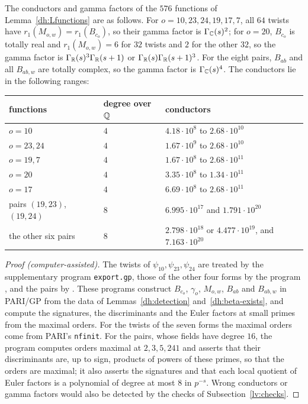 \begin{lemma}\label{dh:gamma}
The conductors and gamma factors of the $576$ functions of
Lemma~\ref{dh:Lfunctions} are as follows. For $o=10,23,24,19,17,7$, all $64$
twists have $r_1(M_{o,w})=r_1(B_{c_o})$, so their gamma factor is
$\Gamma_\mathbb C(s)^2$; for $o=20$, $B_{c_o}$ is totally real and
$r_1(M_{o,w})=6$ for $32$ twists and $2$ for the other $32$, so the gamma
factor is $\Gamma_\mathbb R(s)^3\Gamma_\mathbb R(s+1)$ or $\Gamma_\mathbb R(s)\Gamma_\mathbb R(s+1)^3$. For
the eight pairs, $B_{ab}$ and all $B_{ab,w}$ are totally complex, so the
gamma factor is $\Gamma_\mathbb C(s)^4$. The conductors lie in the following
ranges:
\begin{center}\small
\begin{tabular}{lll}
\toprule
functions & degree over $\mathbb Q$ & conductors\\
\midrule
$o=10$ & $4$ & $4.18\cdot10^8$ to $2.68\cdot10^{10}$\\
$o=23,24$ & $4$ & $1.67\cdot10^9$ to $2.68\cdot10^{10}$\\
$o=19,7$ & $4$ & $1.67\cdot10^8$ to $2.68\cdot10^{11}$\\
$o=20$ & $4$ & $3.35\cdot10^8$ to $1.34\cdot10^{11}$\\
$o=17$ & $4$ & $6.69\cdot10^8$ to $2.68\cdot10^{11}$\\
pairs $(19,23)$, $(19,24)$ & $8$ & $6.995\cdot10^{17}$ and $1.791\cdot10^{20}$\\
the other six pairs & $8$ & $2.798\cdot10^{18}$ or $4.477\cdot10^{19}$, and $7.163\cdot10^{20}$\\
\bottomrule
\end{tabular}
\end{center}
\end{lemma}

\begin{proof}[Proof (computer-assisted)]
The twists of $\psi_{10},\psi_{23},\psi_{24}$ are treated by the
supplementary program \texttt{export.gp}, those of the other four forms by
the program , and the pairs by
. These programs construct $B_{c_o}$, $\gamma_o$,
$M_{o,w}$, $B_{ab}$ and $B_{ab,w}$ in PARI/GP from the data of
Lemmas~\ref{dh:detection} and~\ref{dh:beta-exists}, and compute the
signatures, the discriminants and the Euler factors at small primes from the
maximal orders. For the twists of the seven forms the maximal orders come
from PARI's \texttt{nfinit}. For the pairs, whose fields have degree $16$,
the program computes orders maximal at $2,3,5,241$ and asserts that their
discriminants are, up to sign, products of powers of these primes, so that
the orders are maximal; it also asserts the signatures and that each local
quotient of Euler factors is a polynomial of degree at most $8$ in $p^{-s}$.
Wrong conductors or gamma factors would also be detected by the checks of
Subsection~\ref{lv:checks}.
\end{proof}

